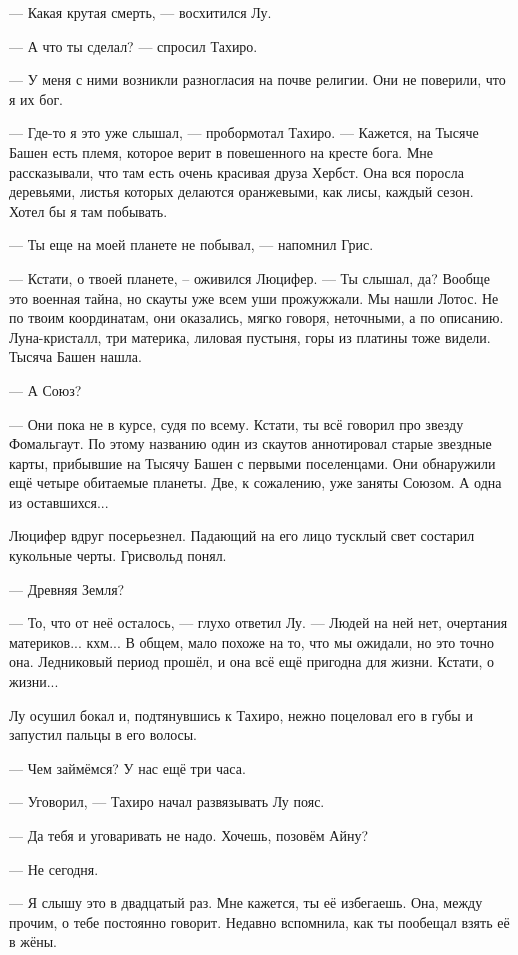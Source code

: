 --- Какая крутая смерть, --- восхитился Лу.

--- А что ты сделал? --- спросил Тахиро.

--- У меня с ними возникли разногласия на почве религии.
Они не поверили, что я их бог.

--- Где-то я это уже слышал, --- пробормотал Тахиро.
--- Кажется, на Тысяче Башен есть племя, которое верит в повешенного на кресте бога.
Мне рассказывали, что там есть очень красивая друза Хербст.
Она вся поросла деревьями, листья которых делаются оранжевыми, как лисы, каждый сезон.
Хотел бы я там побывать.

--- Ты еще на моей планете не побывал, --- напомнил Грис.

--- Кстати, о твоей планете, -- оживился Люцифер.
--- Ты слышал, да?
Вообще это военная тайна, но скауты уже всем уши прожужжали.
Мы нашли Лотос.
Не по твоим координатам, они оказались, мягко говоря, неточными, а по описанию.
Луна-кристалл, три материка, лиловая пустыня, горы из платины тоже видели.
Тысяча Башен нашла.

--- А Союз?

--- Они пока не в курсе, судя по всему.
Кстати, ты всё говорил про звезду Фомальгаут.
По этому названию один из скаутов аннотировал старые звездные карты, прибывшие на Тысячу Башен с первыми поселенцами.
Они обнаружили ещё четыре обитаемые планеты.
Две, к сожалению, уже заняты Союзом.
А одна из оставшихся...

Люцифер вдруг посерьезнел.
Падающий на его лицо тусклый свет состарил кукольные черты.
Грисвольд понял.

--- Древняя Земля?

--- То, что от неё осталось, --- глухо ответил Лу.
--- Людей на ней нет, очертания материков... кхм...
В общем, мало похоже на то, что мы ожидали, но это точно она.
Ледниковый период прошёл, и она всё ещё пригодна для жизни.
Кстати, о жизни...

Лу осушил бокал и, подтянувшись к Тахиро, нежно поцеловал его в губы и запустил пальцы в его волосы.

--- Чем займёмся?
У нас ещё три часа.

--- Уговорил, --- Тахиро начал развязывать Лу пояс.

--- Да тебя и уговаривать не надо.
Хочешь, позовём Айну?

--- Не сегодня.

--- Я слышу это в двадцатый раз.
Мне кажется, ты её избегаешь.
Она, между прочим, о тебе постоянно говорит.
Недавно вспомнила, как ты пообещал взять её в жёны.

